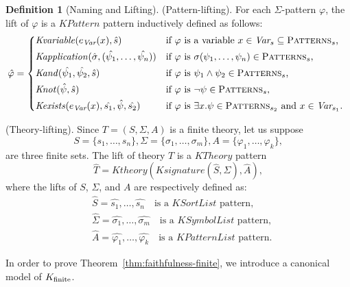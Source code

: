 \documentclass[UTF8,11pt]{article}
\newcounter{thmcounter}
\theoremstyle{plain}
\theoremstyle{definition}
\newtheorem{definition} [thmcounter]{Definition}
\theoremstyle{remark}
\newcommand{\PATTERNS}{\text{P\textsc{atterns}}}
\newcommand{\KPatternList}{\mathit{KPatternList}}
\newcommand{\KSortList}{\mathit{KSortList}}
\newcommand{\KSymbolList}{\mathit{KSymbolList}}
\newcommand{\KPattern}{\mathit{KPattern}}
\newcommand{\Kvariable}{\mathit{Kvariable}}
\newcommand{\Kand}{\mathit{Kand}}
\newcommand{\Knot}{\mathit{Knot}}
\newcommand{\Kapplication}{\mathit{Kapplication}}
\newcommand{\Kexists}{\mathit{Kexists}}
\newcommand{\Ksignature}{\mathit{Ksignature}}
\newcommand{\KTheory}{\mathit{KTheory}}
\newcommand{\Ktheory}{\mathit{Ktheory}}
\begin{document}
\begin{definition}[Naming and Lifting]
    (Pattern-lifting).
    For each $\Sigma$-pattern $\varphi$, the lift of $\varphi$ is a $\KPattern$ pattern inductively defined as follows:
    \begin{equation*}
      \hat{\varphi} =
      \begin{cases*}
        \Kvariable(e_\Var(x), \hat{s}) & if $\varphi$ is a variable $x \in \Var_s \subseteq \PATTERNS_s$,
        \\
        \Kapplication(\hat{\sigma}, (\hat{\psi_1}, \dots, \hat{\psi_n})) & if $\varphi$ is $\sigma(\psi_1,\dots,\psi_n) \in \PATTERNS_s$,
        \\
        \Kand(\hat{\psi_1}, \hat{\psi_2}, \hat{s}) & if $\varphi$ is $\psi_1 \wedge \psi_2 \in \PATTERNS_s$,
        \\
        \Knot(\hat{\psi}, \hat{s}) & if $\varphi$ is $\neg \psi \in \PATTERNS_s$,
        \\
        \Kexists(e_\Var(x), \hat{s_1}, \hat{\psi}, \hat{s_2}) & if $\varphi$ is $\exists x . \psi \in \PATTERNS_{s_2}$ and $x \in \Var_{s_1}$.
      \end{cases*}
    \end{equation*}
    
    (Theory-lifting). Since $T = (S, \Sigma, A)$ is a finite theory, let us suppose
    \begin{equation*}
       S = \{ s_1, \dots, s_n \}, 
       \Sigma = \{ \sigma_1, \dots, \sigma_m \}, 
       A = \{ \varphi_1, \dots, \varphi_k \},
    \end{equation*}
    are three finite sets. The lift of theory $T$ is a $\KTheory$ pattern 
    $$ \hat{T} = \Ktheory(\Ksignature(\hat{S}, \hat{\Sigma}), \hat{A}),$$
    where the lifts of $S$, $\Sigma$, and $A$ are respectively defined as:
    \begin{align*}
    & \hat{S} = \hat{s_1},\dots,\hat{s_n} 
      \quad \text{is a $\KSortList$ pattern},
    \\
    & \hat{\Sigma} = \hat{\sigma_1},\dots,\hat{\sigma_m}
      \quad \text{is a $\KSymbolList$ pattern},
    \\
    & \hat{A} = \hat{\varphi_1}, \dots, \hat{\varphi_k}
      \quad \text{is a $\KPatternList$ pattern}.
    \end{align*}
\end{definition}

In order to prove Theorem~\ref{thm:faithfulness-finite}, we introduce a canonical model of ${K_\text{finite}}$.
\end{document}
